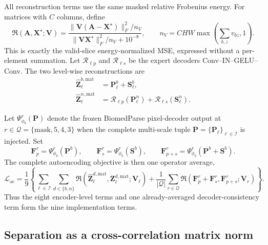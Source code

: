 \documentclass[10pt]{article}
\newcommand{\cI}{\mathcal{I}}
\newcommand{\cQ}{\mathcal{Q}}
\newcommand{\cL}{\mathcal{L}}
\begin{document}
All reconstruction terms use the same masked relative Frobenius energy.  For
matrices with $C$ columns, define
\begin{equation}
    \mathfrak R(\bm A,\bm X^\star;\bm V)
    =\frac{\|\bm V(\bm A-\bm X^\star)\|_F^2/n_V}
           {\|\bm V\bm X^\star\|_F^2/n_V+10^{-8}},
    \qquad n_V=CHW\max\!\left(\sum_{b,z}v_{bz},1\right).
    \label{eq:masked-relative-energy}
\end{equation}
This is exactly the valid-slice energy-normalized MSE, expressed without a
per-element summation.  Let $\mathcal R_{\ell p}$ and
$\mathcal R_{\ell s}$ be the expert decoders
Conv--IN--GELU--Conv.  The two level-wise reconstructions are
\begin{equation}
\begin{aligned}
    \widehat{\bm Z}^{b,\mathrm{mat}}_\ell&=\bm P^b_\ell+\bm S^b_\ell,\\
    \widehat{\bm Z}^{n,\mathrm{mat}}_\ell
      &=\mathcal R_{\ell p}(\bm P^n_\ell)
        +\mathcal R_{\ell s}(\bm S^n_\ell).
\end{aligned}
\label{eq:matrix-reconstructions}
\end{equation}

Let $\Psi^r_{\phi_b}(\bm P)$ denote the frozen BiomedParse pixel-decoder output
at $r\in\cQ=\{\mathrm{mask},5,4,3\}$ when the complete multi-scale tuple
$\bm P=\{\bm P_\ell\}_{\ell\in\cI}$ is injected.  Set
\begin{equation}
    \bm F_p^r=\Psi^r_{\phi_b}(\bm P^b),\qquad
    \bm F_s^r=\Psi^r_{\phi_b}(\bm S^b),\qquad
    \bm F_{p+s}^r=\Psi^r_{\phi_b}(\bm P^b+\bm S^b).
\end{equation}
The complete autoencoding objective is then one operator average,
\begin{equation}
\boxed{
\cL_{\mathrm{ae}}
=\frac{1}{9}\left\{
 \sum_{\ell\in\cI}\sum_{d\in\{b,n\}}
 \mathfrak R(\widehat{\bm Z}^{d,\mathrm{mat}}_\ell,
              \bm Z^{d,\mathrm{mat}}_\ell;\bm V_\ell)
 +\frac{1}{|\cQ|}\sum_{r\in\cQ}
 \mathfrak R(\bm F_p^r+\bm F_s^r,\bm F_{p+s}^r;\bm V_r)
 \right\}.}
\label{eq:unified-reconstruction}
\end{equation}
Thus the eight encoder-level terms and one already-averaged decoder-consistency
term form the nine implementation terms.

\subsection{Separation as a cross-correlation matrix norm}
\end{document}
